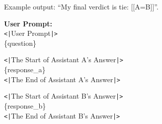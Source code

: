 \documentclass{article} %
\begin{document}
\begin{tcolorbox}[colback=gray!5!white, colframe=gray!60!black, title=Arena-Hard Prompt, breakable]
Example output: ``My final verdict is tie: [[A=B]]''.\\\par
\textbf{User Prompt:}\\
\texttt{<|}User Prompt\texttt{|>}\\
\{question\}\\\par
\texttt{<|}The Start of Assistant A's Answer\texttt{|>}\\
\{response\_a\}\\
\texttt{<|}The End of Assistant A's Answer\texttt{|>}\\\par
\texttt{<|}The Start of Assistant B's Answer\texttt{|>}\\
\{response\_b\}\\
\texttt{<|}The End of Assistant B's Answer\texttt{|>}
\end{tcolorbox}
\end{document}
